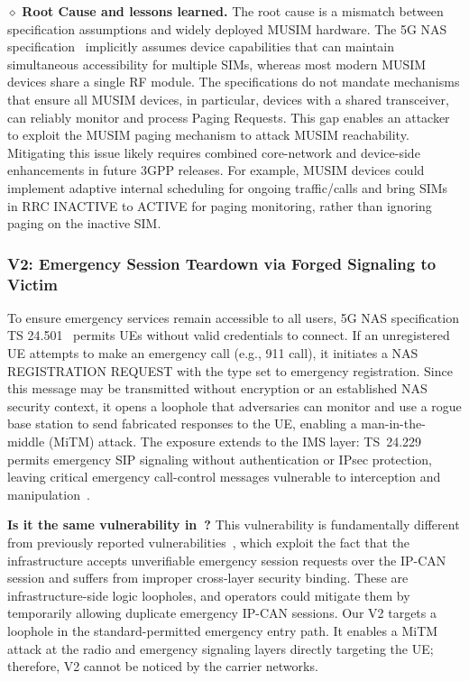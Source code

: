 \noindent $\diamond$ \textbf{Root Cause and lessons learned.} 
The root cause is a mismatch between specification assumptions and widely deployed MUSIM hardware. The 5G NAS specification~\cite{3GPP_TS_24501} implicitly assumes device capabilities that can maintain simultaneous accessibility for multiple SIMs, whereas most modern MUSIM devices share a single RF module. The specifications do not mandate mechanisms that ensure all MUSIM devices, in particular, devices with a shared transceiver, can reliably monitor and process Paging Requests. This gap enables an attacker to exploit the MUSIM paging mechanism to attack MUSIM reachability.  Mitigating this issue likely requires combined core-network and device-side enhancements in future 3GPP releases. For example, MUSIM devices could implement adaptive internal scheduling for ongoing traffic/calls and bring SIMs in RRC INACTIVE to ACTIVE for paging monitoring, rather than ignoring paging on the inactive SIM. 

\vspace{-0.10in}
\subsubsection{V2: Emergency Session Teardown via Forged Signaling to Victim} 
\noindent To ensure emergency services remain accessible to all users, 5G NAS specification TS 24.501~\cite{3GPP_TS_24501} permits UEs without valid credentials to connect. If an unregistered UE attempts to make an emergency call (e.g., 911 call), it initiates a NAS REGISTRATION REQUEST with the type set to emergency registration. Since this message may be transmitted without encryption or an established NAS security context, it opens a loophole that adversaries can monitor and use a rogue base station to send fabricated responses to the UE, enabling a man-in-the-middle (MiTM) attack. 
The exposure extends to the IMS layer: TS~24.229 permits emergency SIP signaling without authentication or IPsec protection, leaving critical emergency call-control messages vulnerable to interception and manipulation~\cite{hu2024uncovering, 10479537, inproceedings,10.1145/3599184.3599195}. 

\noindent \textbf{Is it the same vulnerability in~\cite{hu2022uncovering}?} This vulnerability is fundamentally different from previously reported vulnerabilities~\cite{hu2022uncovering}, which exploit the fact that the infrastructure accepts unverifiable emergency session requests over the IP-CAN session and suffers from improper cross-layer security binding. These are infrastructure-side logic loopholes, and operators could mitigate them by temporarily allowing duplicate emergency IP-CAN sessions. Our V2 targets a loophole in the standard-permitted emergency entry path. It enables a MiTM attack at the radio and emergency signaling layers directly targeting the UE; therefore, V2 cannot be noticed by the carrier networks.

